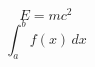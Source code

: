 \documentclass{article}
\begin{document}
        \[E = mc^2\]
\[\int_a^b f(x) \, dx\]
        
\end{document}
